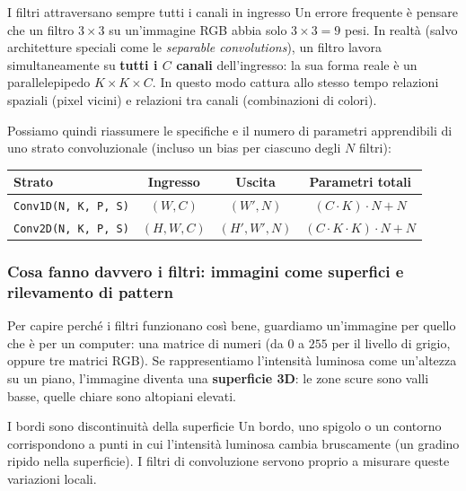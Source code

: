 \documentclass[12pt]{extarticle}
\begin{document}
\begin{attenzionebox}{I filtri attraversano sempre tutti i canali in ingresso}
Un errore frequente è pensare che un filtro $3\times 3$ su un'immagine RGB abbia solo $3\times 3 = 9$ pesi. In realtà (salvo architetture speciali come le \emph{separable convolutions}), un filtro lavora simultaneamente su \textbf{tutti i $C$ canali} dell'ingresso: la sua forma reale è un parallelepipedo $K \times K \times C$. In questo modo cattura allo stesso tempo relazioni spaziali (pixel vicini) e relazioni tra canali (combinazioni di colori).
\end{attenzionebox}

\noindent Possiamo quindi riassumere le specifiche e il numero di parametri apprendibili di uno strato convoluzionale (incluso un bias per ciascuno degli $N$ filtri):

\begin{center}
\small
\renewcommand{\arraystretch}{1.25}
\begin{tabular}{lccc}
    \toprule
    \textbf{Strato} & \textbf{Ingresso} & \textbf{Uscita} & \textbf{Parametri totali} \\
    \midrule
    \texttt{Conv1D(N, K, P, S)} & $(W, C)$ & $(W', N)$ & $(C \cdot K) \cdot N + N$ \\
    \texttt{Conv2D(N, K, P, S)} & $(H, W, C)$ & $(H', W', N)$ & $(C \cdot K \cdot K) \cdot N + N$ \\
    \bottomrule
\end{tabular}
\end{center}

\subsubsection{Cosa fanno davvero i filtri: immagini come superfici e rilevamento di pattern}

\noindent Per capire perché i filtri funzionano così bene, guardiamo un'immagine per quello che è per un computer: una matrice di numeri (da $0$ a $255$ per il livello di grigio, oppure tre matrici RGB). Se rappresentiamo l'intensità luminosa come un'altezza su un piano, l'immagine diventa una \textbf{superficie 3D}: le zone scure sono valli basse, quelle chiare sono altopiani elevati.

\begin{ideabox}{I bordi sono discontinuità della superficie}
Un bordo, uno spigolo o un contorno corrispondono a punti in cui l'intensità luminosa cambia bruscamente (un gradino ripido nella superficie). I filtri di convoluzione servono proprio a misurare queste variazioni locali.
\end{ideabox}
\end{document}
